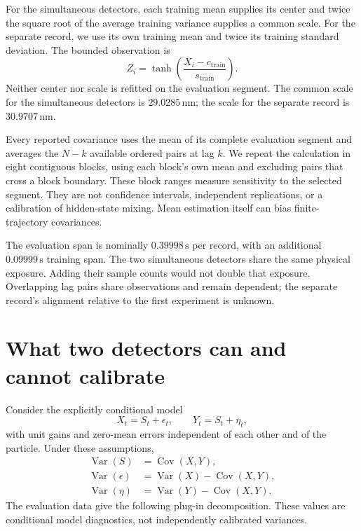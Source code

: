 For the simultaneous detectors, each training mean supplies its center and
twice the square root of the average training variance supplies a common
scale. For the separate record, we use its own training mean and twice its
training standard deviation. The bounded observation is
\[
  Z_i=\tanh\!\left(\frac{X_i-c_{\mathrm{train}}}
                                  {s_{\mathrm{train}}}\right).
\]
Neither center nor scale is refitted on the evaluation segment. The common
scale for the simultaneous detectors is $29.0285\,\mathrm{nm}$; the scale for
the separate record is $30.9707\,\mathrm{nm}$.

Every reported covariance uses the mean of its complete evaluation segment
and averages the $N-k$ available ordered pairs at lag $k$. We repeat the
calculation in eight contiguous blocks, using each block's own mean and
excluding pairs that cross a block boundary. These block ranges measure
sensitivity to the selected segment. They are not confidence intervals,
independent replications, or a calibration of hidden-state mixing. Mean
estimation itself can bias finite-trajectory covariances.

The evaluation span is nominally $0.39998\,\mathrm{s}$ per record, with an
additional $0.09999\,\mathrm{s}$ training span. The two simultaneous detectors
share the same physical exposure. Adding their sample counts would not double
that exposure. Overlapping lag pairs share observations and remain dependent;
the separate record's alignment relative to the first experiment is unknown.

\section{What two detectors can and cannot calibrate}

Consider the explicitly conditional model
\[
 X_t=S_t+\epsilon_t,\qquad Y_t=S_t+\eta_t,
\]
with unit gains and zero-mean errors independent of each other and of the
particle. Under these assumptions,
\begin{align}
 \operatorname{Var}(S)&=\operatorname{Cov}(X,Y),\\
 \operatorname{Var}(\epsilon)&=\operatorname{Var}(X)-\operatorname{Cov}(X,Y),\\
 \operatorname{Var}(\eta)&=\operatorname{Var}(Y)-\operatorname{Cov}(X,Y).
\end{align}
The evaluation data give the following plug-in decomposition. These values
are conditional model diagnostics, not independently calibrated variances.

